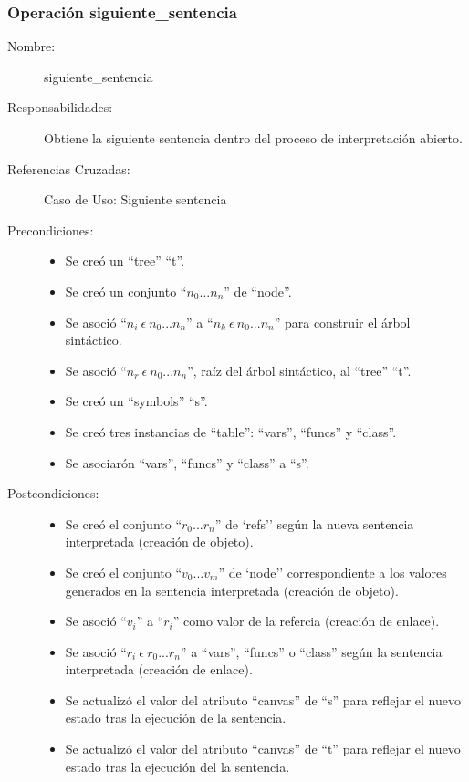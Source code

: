 \subsubsection{Operación siguiente\_sentencia}

	\begin{description}
		\item [Nombre:] siguiente\_sentencia
		\item [Responsabilidades:] Obtiene la siguiente sentencia dentro del proceso de interpretación abierto.
		\item [Referencias Cruzadas: ] Caso de Uso: Siguiente sentencia
      \item [Precondiciones:] \hfill
         \begin {itemize}
         \item Se creó un ``tree'' ``t''.
         \item Se creó un conjunto ``$n_0...n_n$'' de ``node''.
         \item Se asoció ``$n_i\ \epsilon\ n_0...n_n$'' a ``$n_k\ \epsilon\ n_0...n_n$'' para construir el árbol sintáctico.
         \item Se asoció  ``$n_r\ \epsilon\ n_0...n_n$'', raíz del árbol sintáctico, al ``tree'' ``t''.
         \item Se creó un ``symbols'' ``s''.
         \item Se creó tres instancias de ``table'': ``vars'', ``funcs'' y ``class''.
         \item Se asociarón ``vars'', ``funcs'' y ``class'' a ``s''.
      \end{itemize}
      \item [Postcondiciones:] \hfill
      \begin {itemize}
         \item Se creó el conjunto ``$r_0...r_n$'' de `refs'' según la nueva sentencia interpretada (creación de objeto).
         \item Se creó el conjunto ``$v_0...v_m$'' de `node'' correspondiente a los valores generados en la sentencia  interpretada (creación de objeto).
         \item Se asoció ``$v_i$'' a ``$r_i$'' como valor de la refercia (creación de enlace).
         \item Se asoció ``$r_i\ \epsilon \ r_0...r_n$'' a ``vars'', ``funcs'' o ``class'' según la sentencia interpretada (creación de enlace).  
         \item Se actualizó el valor del atributo ``canvas'' de ``s'' para reflejar el nuevo estado tras la ejecución de la sentencia.
         \item Se actualizó el valor del atributo ``canvas'' de ``t'' para reflejar el nuevo estado tras la ejecución del la sentencia.
      \end{itemize}
	\end{description}



